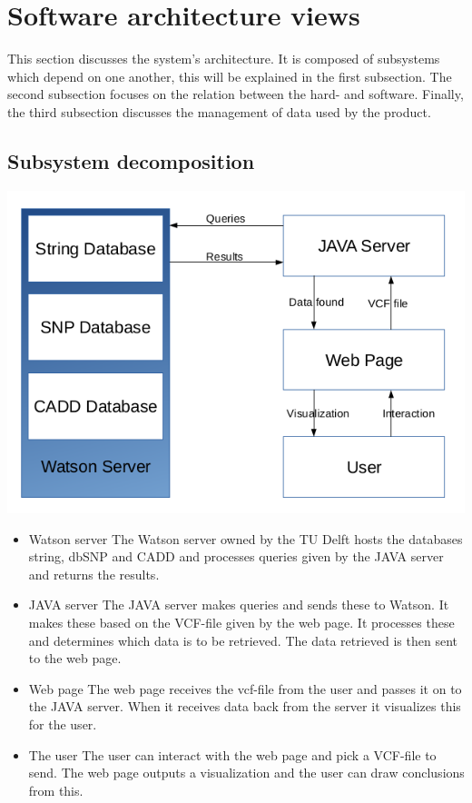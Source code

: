 \section{Software architecture views}
	This section discusses the system's architecture. It is composed of subsystems which depend on one another, this will be explained in the first subsection. The second subsection focuses on the relation between the hard- and software. Finally, the third subsection discusses the management of data used by the product.
	\subsection{Subsystem decomposition}
		\includegraphics[scale=0.5]{schema1.png}
		\begin{itemize}
			\item Watson server
				\subitem The Watson server owned by the TU Delft hosts the databases string\cite{franceschini2013string}, dbSNP\cite{sherry2001dbsnp} and CADD\cite{kircher2014general} and processes queries given by the JAVA server and returns the results.
			\item JAVA server
				\subitem The JAVA server makes queries and sends these to Watson. It makes these based on the VCF-file given by the web page. It processes these and determines which data is to be retrieved. The data retrieved is then sent to the web page.
			\item Web page
				\subitem The web page receives the vcf-file from the user and passes it on to the JAVA server. When it receives data back from the server it visualizes this for the user.
			\item The user 
				\subitem The user can interact with the web page and pick a VCF-file to send. The web page outputs a visualization and the user can draw conclusions from this.
		\end{itemize}
